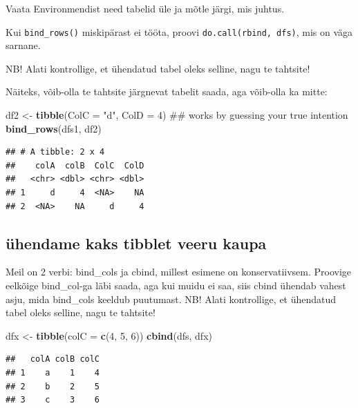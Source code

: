 \documentclass[]{book}
\newenvironment{Shaded}{\begin{snugshade}}{\end{snugshade}}
\newcommand{\KeywordTok}[1]{\textcolor[rgb]{0.13,0.29,0.53}{\textbf{#1}}}
\newcommand{\DataTypeTok}[1]{\textcolor[rgb]{0.13,0.29,0.53}{#1}}
\newcommand{\DecValTok}[1]{\textcolor[rgb]{0.00,0.00,0.81}{#1}}
\newcommand{\StringTok}[1]{\textcolor[rgb]{0.31,0.60,0.02}{#1}}
\newcommand{\NormalTok}[1]{#1}
\begin{document}
Vaata Environmendist need tabelid üle ja mõtle järgi, mis juhtus.

Kui \texttt{bind\_rows()} miskipärast ei tööta, proovi
\texttt{do.call(rbind,\ dfs)}, mis on väga sarnane.

NB! Alati kontrollige, et ühendatud tabel oleks selline, nagu te
tahtsite!

Näiteks, võib-olla te tahtsite järgnevat tabelit saada, aga võib-olla ka
mitte:

\begin{Shaded}
\begin{Highlighting}[]
\NormalTok{df2 <-}\StringTok{ }\KeywordTok{tibble}\NormalTok{(}\DataTypeTok{ColC =} \StringTok{"d"}\NormalTok{, }\DataTypeTok{ColD =} \DecValTok{4}\NormalTok{)}
\NormalTok{## works by guessing your true intention}
\KeywordTok{bind_rows}\NormalTok{(dfs1, df2)}
\end{Highlighting}
\end{Shaded}

\begin{verbatim}
## # A tibble: 2 x 4
##    colA  colB  ColC  ColD
##   <chr> <dbl> <chr> <dbl>
## 1     d     4  <NA>    NA
## 2  <NA>    NA     d     4
\end{verbatim}

\subsection{ühendame kaks tibblet veeru
kaupa}\label{uhendame-kaks-tibblet-veeru-kaupa}

Meil on 2 verbi: bind\_cols ja cbind, millest esimene on
konservatiivsem. Proovige eelkõige bind\_col-ga läbi saada, aga kui
muidu ei saa, siis cbind ühendab vahest asju, mida bind\_cols keeldub
puutumast. NB! Alati kontrollige, et ühendatud tabel oleks selline, nagu
te tahtsite!

\begin{Shaded}
\begin{Highlighting}[]
\NormalTok{dfx <-}\StringTok{ }\KeywordTok{tibble}\NormalTok{(}\DataTypeTok{colC =} \KeywordTok{c}\NormalTok{(}\DecValTok{4}\NormalTok{, }\DecValTok{5}\NormalTok{, }\DecValTok{6}\NormalTok{))}
\KeywordTok{cbind}\NormalTok{(dfs, dfx)}
\end{Highlighting}
\end{Shaded}

\begin{verbatim}
##   colA colB colC
## 1    a    1    4
## 2    b    2    5
## 3    c    3    6
\end{verbatim}
\end{document}
